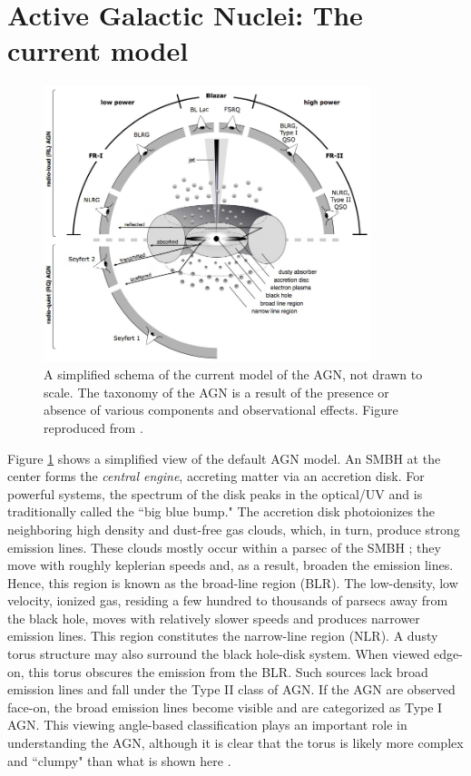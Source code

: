 \section{Active Galactic Nuclei: The current model \label{sec:agn_current_model}}
\begin{figure}
        \centering
    \includegraphics[width=0.849\textwidth]{images/misc/agn_model.jpg}%
    \caption{A simplified schema of the current model of the AGN, not drawn to scale. The taxonomy of the AGN is a result of the presence or absence of various components and observational effects. Figure reproduced from \citet{beckmann2012agn}.\label{fig:agn_model} }
\end{figure}
Figure \ref{fig:agn_model} shows a simplified view of the default AGN model. An SMBH at the center forms the \textit{central engine}, accreting matter via an accretion disk. For powerful systems, the spectrum of the disk peaks in the optical/UV and is traditionally called the ``big blue bump." The accretion disk photoionizes the neighboring high density and dust-free gas clouds, which, in turn, produce strong emission lines. These clouds mostly occur within a parsec of the SMBH \citep{peterson2006broad}; they move with roughly keplerian speeds and, as a result,  broaden the emission lines. Hence, this region is known as the broad-line region (BLR). The low-density, low velocity, ionized gas, residing a few hundred to thousands of parsecs away from the black hole, moves with relatively slower speeds and produces narrower emission lines. This region constitutes the narrow-line region (NLR). A dusty torus structure may also surround the black hole-disk system. When viewed edge-on, this torus obscures the emission from the BLR. Such sources lack broad emission lines and fall under the Type II class of AGN. If the AGN are observed face-on, the broad emission lines become visible and are categorized as Type I AGN. This viewing angle-based classification plays an important role in understanding the AGN, although it is clear that the torus is likely more complex and ``clumpy" than what is shown here \citep[see][and references there in]{H_nig_2019}.
